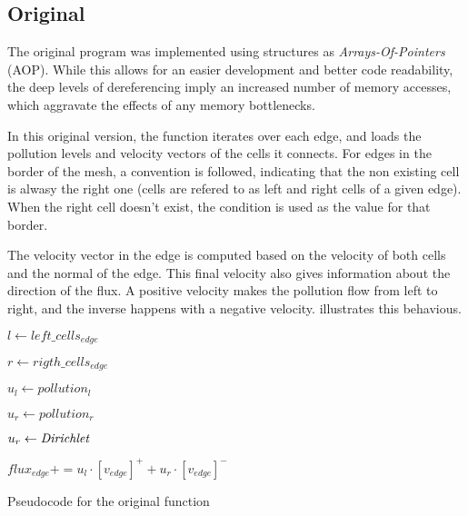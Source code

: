 \subsection{Original}
\label{sec:310}

The original \polu program was implemented using structures as \textit{Arrays-Of-Pointers} (AOP). While this allows for an easier development and better code readability, the deep levels of dereferencing imply an increased number of memory accesses, which aggravate the effects of any memory bottlenecks.

In this original version, the \computeflux function iterates over each edge, and loads the pollution levels and velocity vectors of the cells it connects. For edges in the border of the mesh, a convention is followed, indicating that the non existing cell is alwasy the right one (cells are refered to as left and right cells of a given edge). When the right cell doesn't exist, the \dirichlet condition is used as the value for that border.

The velocity vector in the edge is computed based on the velocity of both cells and the normal of the edge. This final velocity also gives information about the direction of the flux. A positive velocity makes the pollution flow from left to right, and the inverse happens with a negative velocity.  illustrates this behavious.



\begin{algorithm}[!htp]
	\begin{algorithmic}

			$l     \gets left\_cells_{edge}$

			$r     \gets rigth\_cells_{edge}$

			$u_{l} \gets pollution_{l}$


				$u_{r} \gets pollution_{r}$
			\Else

				$u_{r} \gets \textit{Dirichlet}$
			\EndIf


			$flux_{edge} += u_{l} \cdot [v_{edge}]^{+} + u_{r} \cdot [v_{edge}]^{-}$
		\EndFor
	\end{algorithmic}

	\caption{Pseudocode for the original \computeflux function}
	\label{alg:flux}
\end{algorithm}

